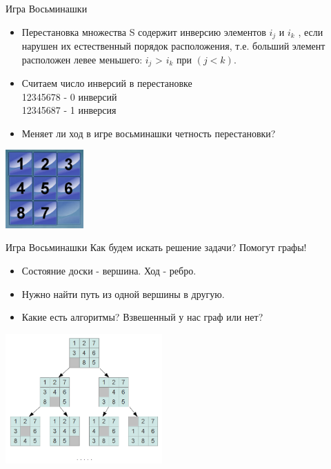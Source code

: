 \documentclass[10pt]{beamer}
\begin{document}
\begin{frame}[fragile]{Игра Восьминашки}
\begin{itemize}
    \item Перестановка множества  S  содержит инверсию элементов  $i_j$  и  $i_k$ , если нарушен их естественный порядок расположения, т.е. больший элемент расположен левее меньшего: $i_j$ >  $i_k$  при $(j < k)$.
    \item Считаем число инверсий в перестановке \\
    12345678 - 0 инверсий \\
    12345687 - 1 инверсия
    \item Меняет ли ход в игре восьминашки четность перестановки?
\end{itemize}
\begin{center}
    \includegraphics[width=3cm]{Term_2/Source/images/8puzzle_odd.png}
\end{center}
\end{frame}


\begin{frame}[fragile]{Игра Восьминашки}
Как будем искать решение задачи? Помогут графы!
\begin{itemize}
    \item Состояние доски - вершина. Ход - ребро.
    \item Нужно найти путь из одной вершины в другую.
    \item Какие есть алгоритмы? Взвешенный у нас граф или нет?
\end{itemize}
\begin{center}
    \includegraphics[width=6cm]{Term_2/Source/images/8_perebor.png}
\end{center}
\end{frame}
\end{document}
